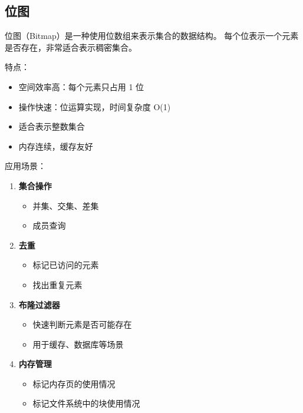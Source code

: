 \subsection{位图}


位图（Bitmap）是一种使用位数组来表示集合的数据结构。
每个位表示一个元素是否存在，非常适合表示稠密集合。

特点：
\begin{itemize}
  \item 空间效率高：每个元素只占用 1 位
  \item 操作快速：位运算实现，时间复杂度 O(1)
  \item 适合表示整数集合
  \item 内存连续，缓存友好
\end{itemize}

应用场景：
\begin{enumerate}
  \item \textbf{集合操作}
    \begin{itemize}
      \item 并集、交集、差集
      \item 成员查询
    \end{itemize}

  \item \textbf{去重}
    \begin{itemize}
      \item 标记已访问的元素
      \item 找出重复元素
    \end{itemize}

  \item \textbf{布隆过滤器}
    \begin{itemize}
      \item 快速判断元素是否可能存在
      \item 用于缓存、数据库等场景
    \end{itemize}

  \item \textbf{内存管理}
    \begin{itemize}
      \item 标记内存页的使用情况
      \item 标记文件系统中的块使用情况
    \end{itemize}
\end{enumerate}

